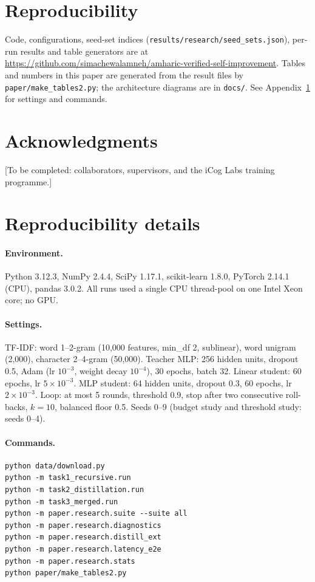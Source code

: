 \section*{Reproducibility}
{\sloppy Code, configurations, seed-set indices (\texttt{results/research/seed\_sets.json}), per-run results and table generators are at \url{https://github.com/simachewalamneh/amharic-verified-self-improvement}. Tables and numbers in this paper are generated from the result files by \texttt{paper/make\_tables2.py}; the architecture diagrams are in \texttt{docs/}. See Appendix~\ref{app:repro} for settings and commands.}

\section*{Acknowledgments}
[To be completed: collaborators, supervisors, and the iCog Labs training programme.]




\appendix
\section{Reproducibility details}\label{app:repro}
\paragraph{Environment.} Python 3.12.3, NumPy 2.4.4, SciPy 1.17.1, scikit-learn 1.8.0, PyTorch 2.14.1 (CPU), pandas 3.0.2. All runs used a single CPU thread-pool on one Intel Xeon core; no GPU.

\paragraph{Settings.} TF-IDF: word 1--2-gram (10{,}000 features, min\_df 2, sublinear), word unigram (2{,}000), character 2--4-gram (50{,}000). Teacher MLP: 256 hidden units, dropout 0.5, Adam (lr $10^{-3}$, weight decay $10^{-4}$), 30 epochs, batch 32. Linear student: 60 epochs, lr $5\times10^{-3}$. MLP student: 64 hidden units, dropout 0.3, 60 epochs, lr $2\times10^{-3}$. Loop: at most 5 rounds, threshold 0.9, stop after two consecutive roll-backs, $k=10$, balanced floor 0.5. Seeds 0--9 (budget study and threshold study: seeds 0--4).

\paragraph{Commands.}
\begin{verbatim}
python data/download.py
python -m task1_recursive.run
python -m task2_distillation.run
python -m task3_merged.run
python -m paper.research.suite --suite all
python -m paper.research.diagnostics
python -m paper.research.distill_ext
python -m paper.research.latency_e2e
python -m paper.research.stats
python paper/make_tables2.py
\end{verbatim}

